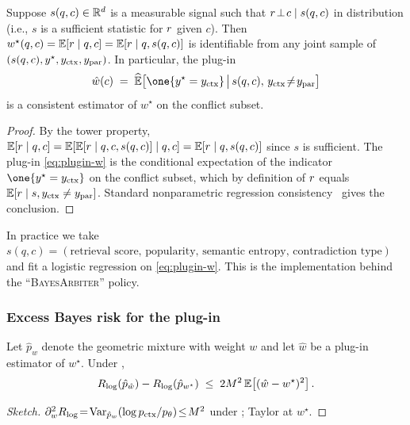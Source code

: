\begin{lemma}
\label{lem:identifiability}
Suppose $s(q,c)\in\mathbb{R}^d$ is a measurable signal such that $r\!\perp\! c\mid s(q,c)$
in distribution (i.e., $s$ is a sufficient statistic for $r$ given $c$).
Then $w^\star(q,c)=\mathbb{E}[r\mid q,c]=\mathbb{E}[r\mid q,s(q,c)]$ is
identifiable from any joint sample of $(s(q,c),y^\star,y_{\mathrm{ctx}},y_{\mathrm{par}})$.
In particular, the plug-in
\begin{equation}
\hat w(c)\;=\;\widehat{\E}\!\left[\one{y^\star=y_{\ctx}}\,\big|\,s(q,c),\,y_{\ctx}\!\neq\!y_\param\right]
\label{eq:plugin-w}
\end{equation}
is a consistent estimator of $w^\star$ on the conflict subset.
\end{lemma}

\begin{proof}
By the tower property,
$\mathbb{E}[r\mid q,c]=\mathbb{E}[\mathbb{E}[r\mid q,c,s(q,c)]\mid q,c]
=\mathbb{E}[r\mid q,s(q,c)]$ since $s$ is sufficient.  The plug-in
\eqref{eq:plugin-w} is the conditional expectation of the indicator
$\one{y^\star=y_{\ctx}}$ on the conflict subset, which by definition of
$r$ equals $\mathbb{E}[r\mid s,y_{\mathrm{ctx}}\neq y_{\mathrm{par}}]$.
Standard nonparametric regression
consistency~\citep{tsybakov2009nonparametric} gives the conclusion.
\end{proof}

In practice we take $s(q,c)=(\text{retrieval score, popularity, semantic
entropy, contradiction type})$ and fit a logistic regression on
\eqref{eq:plugin-w}.  This is the implementation behind the ``\textsc{BayesArbiter}''
policy.

\subsubsection{Excess Bayes risk for the plug-in}
\label{app:thm1-excess-risk}

\begin{lemma}
\label{lem:excess-risk-log}
Let $\hat p_w$ denote the geometric mixture with weight $w$ and let
$\hat w$ be a plug-in estimator of $w^\star$.  Under
,
\begin{equation}
R_{\log}(\hat p_{\hat w})-R_{\log}(\hat p_{w^\star})\;\leq\;
2M^2\,\mathbb{E}\!\left[(\hat w-w^\star)^2\right].
\label{eq:plugin-log-risk}
\end{equation}
\end{lemma}

\begin{proof}[Sketch]
$\partial_w^2 R_{\log}\!=\!\operatorname{Var}_{\hat p_w}(\log p_{\mathrm{ctx}}/p_\theta)\!\le\!M^2$
under ; Taylor at $w^\star$.
\end{proof}

